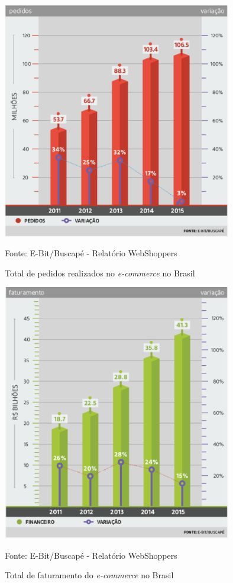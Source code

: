 \documentclass[a4paper,12pt]{monografia}
\begin{document}
\begin{figure}[H]
\centering
\includegraphics[width=10cm]{img/webshoppers/total-pedidos.eps}
\caption{Total de pedidos realizados no \textit{e-commerce} no Brasil}
\small{Fonte: E-Bit/Buscapé - Relatório WebShoppers}
\label{figura:pedidos}
\end{figure}

\begin{figure}[H]
\centering
\includegraphics[width=10cm]{img/webshoppers/faturamento.eps}
\caption{Total de faturamento do \textit{e-commerce} no Brasil}
\small{Fonte: E-Bit/Buscapé - Relatório WebShoppers}
\label{figura:vendas}
\end{figure}
\end{document}
